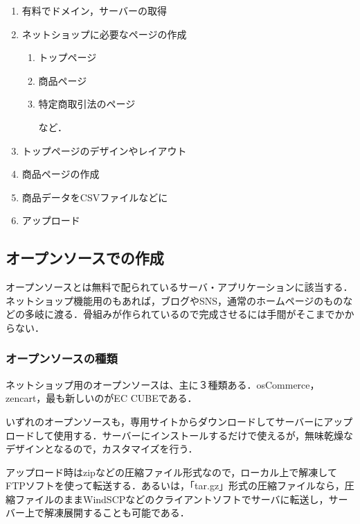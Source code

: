 \begin{enumerate}

 \item	有料でドメイン，サーバーの取得

 \item	ネットショップに必要なページの作成

\begin{enumerate}
\setlength{\parskip}{3mm}

 \item	トップページ

 \item	商品ページ

 \item	特定商取引法のページ

など．

\end{enumerate}

 \item	トップページのデザインやレイアウト

 \item	商品ページの作成

 \item	商品データをCSVファイルなどに

 \item	アップロード

\end{enumerate}


\subsection{オープンソースでの作成}

オープンソースとは無料で配られているサーバ・アプリケーションに該当する．ネットショップ機能用のもあれば，ブログやSNS，通常のホームページのものなどの多岐に渡る．骨組みが作られているので完成させるには手間がそこまでかからない．

\subsubsection{オープンソースの種類}

ネットショップ用のオープンソースは、主に３種類ある．osCommerce，zencart，最も新しいのがEC CUBEである．


いずれのオープンソースも，専用サイトからダウンロードしてサーバーにアップロードして使用する．サーバーにインストールするだけで使えるが，無味乾燥なデザインとなるので，カスタマイズを行う．


アップロード時はzipなどの圧縮ファイル形式なので，ローカル上で解凍してFTPソフトを使って転送する．あるいは，「tar.gz」形式の圧縮ファイルなら，圧縮ファイルのままWindSCPなどのクライアントソフトでサーバに転送し，サーバー上で解凍展開することも可能である．

